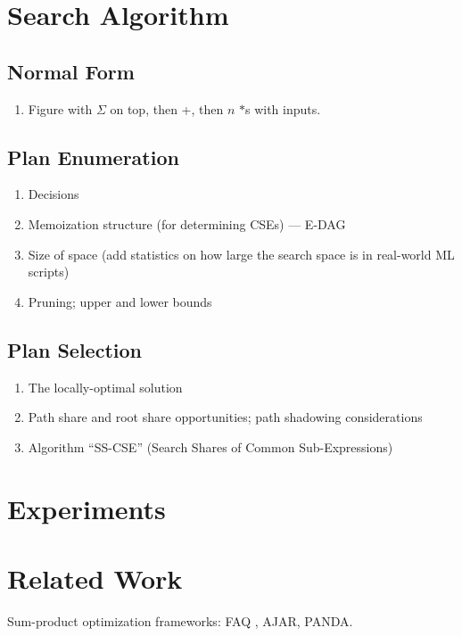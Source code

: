 \documentclass{vldb}
\begin{document}
\section{Search Algorithm}

\subsection{Normal Form}
\begin{enumerate}
\item Figure with $\Sigma$ on top, then +, then $n$ $*$s with inputs.
\end{enumerate}

\subsection{Plan Enumeration}
\begin{enumerate}
\item Decisions
\item Memoization structure (for determining CSEs) --- E-DAG
\item Size of space (add statistics on how large the search space is in real-world ML scripts)
\item Pruning; upper and lower bounds
\end{enumerate}

\subsection{Plan Selection}
\begin{enumerate}
\item The locally-optimal solution
\item Path share and root share opportunities; path shadowing considerations
\item Algorithm ``SS-CSE'' (Search Shares of Common Sub-Expressions)
\end{enumerate}

\section{Experiments}



\section{Related Work}
\label{sec:rwork}

Sum-product optimization frameworks: FAQ \cite{KhamisNR16}, AJAR, PANDA.
\end{document}

